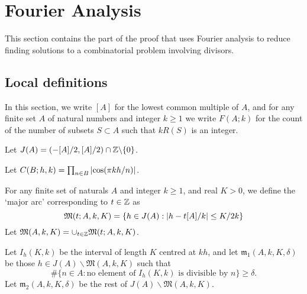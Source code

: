 \chapter{Fourier Analysis}
\label{chap:fourier}

This section contains the part of the proof that uses Fourier analysis to reduce finding solutions to a combinatorial problem involving divisors.
\section{Local definitions}

\begin{definition}
  \label{def:integer_count}
  \leanok
  In this section, we write $[A]$ for the lowest common multiple of $A$, and for any finite set $A$ of natural numbers and integer $k\geq 1$ we write $F(A;k)$ for the count of the number of subsets $S\subset A$ such that $kR(S)$ is an integer.
\end{definition}

\begin{definition}
  \label{def:j}
  \leanok
  Let $J(A) = (-[A]/2,[A]/2)\cap\mathbb{Z} \backslash \{0\}$.
\end{definition}

\begin{definition}
  \label{def:cos_prod}
  \leanok
  Let $C(B;h,k) = \prod_{n\in B}\left\lvert \cos(\pi kh/n)\right\rvert$.
\end{definition}

\begin{definition}
  \label{def:major_arc}
  For any finite set of naturals $A$ and integer $k\geq 1$, and real $K>0$, we define the `major arc' corresponding to $t\in\mathbb{Z}$ as
\[\mathfrak{M}(t;A,k,K) = \{ h\in  J(A): \left\lvert h-t[A]/k\right\rvert\leq K/2k\}\]
  Let $\mathfrak{M}(A,k,K) = \cup_{t\in \mathbb{Z}}\mathfrak{M}(t;A,k,K)$.
\end{definition}

\begin{definition}
  \label{def:minor_arcs}
Let $I_h(K,k)$ be the interval of length $K$ centred at $kh$, and let $\mathfrak{m}_1(A,k,K,\delta)$ be those $h\in J(A)\backslash \mathfrak{M}(A,k,K)$ such that
\[\# \{ n\in A : \textrm{no element of }I_h(K,k)\textrm{ is divisible by }n\}\geq \delta.\]
Let $\mathfrak{m}_2(A,k,K,\delta)$ be the rest of $J(A)\backslash\mathfrak{M}(A,k,K)$.
\end{definition}

